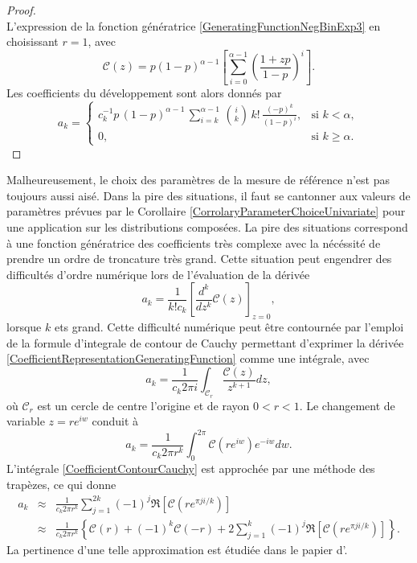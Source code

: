 \begin{proof}
\begin{equation}
\end{equation}
L'expression de la fonction génératrice \eqref{GeneratingFunctionNegBinExp3} en choisissant $r=1$, avec 
\begin{equation}\label{GeneratingFunctionNegBinExp4}
\mathcal{C}(z)=p(1-p)^{\alpha-1}\left[\sum_{i=0}^{\alpha-1}\left(\frac{1+zp}{1-p}\right)^{i}\right].
\end{equation}
Les coefficients du développement sont alors donnés par 
\[
a_{k} =
  \begin{cases}
   c_{k}^{-1}p\,(1-p)^{\alpha-1}\,\sum_{i=k}^{\alpha-1}\,\binom{i}{k}\,k!\,\frac{(-p)^{k}}{(1-p)^{i}}, & \text{si } k<\alpha,\\
   0,      & \text{si } k\geq\alpha.
  \end{cases} 
\]
\end{proof}

Malheureusement, le choix des paramètres de la mesure de référence n\rq{}est pas toujours aussi aisé. Dans la pire des situations, il faut se cantonner aux valeurs de paramètres prévues par le Corollaire \ref{CorrolaryParameterChoiceUnivariate} pour une application sur les distributions composées. La pire des situations correspond à une fonction génératrice des coefficients très complexe avec la nécéssité de prendre un ordre de troncature très grand. Cette situation peut engendrer des difficultés d\rq{}ordre numérique lors de l\rq{}évaluation de la dérivée
\begin{equation}\label{CoefficientRepresentationGeneratingFunction}
a_{k}=\frac{1}{k!c_{k}}\left[\frac{d^{k}}{dz^{k}}\mathcal{C}(z)\right]_{z=0},
\end{equation}
lorsque $k$ ets grand. Cette difficulté numérique peut être contournée par l\rq{}emploi de la formule d\rq{}integrale de contour de Cauchy permettant d\rq{}exprimer la dérivée \eqref{CoefficientRepresentationGeneratingFunction} comme une intégrale, avec
\begin{equation*}
a_{k}=\frac{1}{c_{k}2\pi i}\int_{\mathcal{C}_{r}}\frac{\mathcal{C}(z)}{z^{k+1}}dz,
\end{equation*}
où $\mathcal{C}_{r}$ est un cercle de centre l\rq{}origine et de rayon $0<r<1$. Le changement de variable $z=re^{iw}$ conduit à 
\begin{equation}\label{CoefficientContourCauchy}
a_{k}=\frac{1}{c_{k}2\pi r^{k}}\int_{0}^{2\pi}\mathcal{C}\left(re^{iw}\right)e^{-iw}dw.
\end{equation}
L\rq{}intégrale \eqref{CoefficientContourCauchy} est approchée par une méthode des trapèzes, ce qui donne
\begin{eqnarray}
a_{k}&\approx& \frac{1}{c_{k}2\pi r^{k}}\sum_{j=1}^{2k}(-1)^{j}\Re\left[\mathcal{C}\left(re^{\pi ji/k}\right)\right]\nonumber\\
&\approx& \frac{1}{c_{k}2\pi r^{k}}\left\{\mathcal{C}(r)+(-1)^{k}\mathcal{C}(-r)+2\sum_{j=1}^{k}(-1)^{j}\Re\left[\mathcal{C}\left(re^{\pi ji/k}\right)\right]\right\}.\nonumber
\end{eqnarray}
La pertinence d\rq{}une telle approximation est étudiée dans le papier d\rq{}\citet{AbChWh95}.


